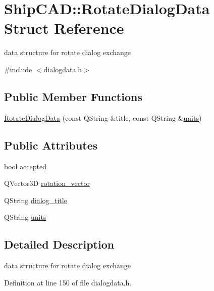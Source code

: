 \hypertarget{structShipCAD_1_1RotateDialogData}{}\section{Ship\+C\+AD\+:\+:Rotate\+Dialog\+Data Struct Reference}
\label{structShipCAD_1_1RotateDialogData}


data structure for rotate dialog exchange  




{\ttfamily \#include $<$dialogdata.\+h$>$}

\subsection*{Public Member Functions}
\begin{DoxyCompactItemize}
\item 
\hyperlink{structShipCAD_1_1RotateDialogData_a9314bfd6204d624e7141d76ee8e17e3a}{Rotate\+Dialog\+Data} (const Q\+String \&title, const Q\+String \&\hyperlink{structShipCAD_1_1RotateDialogData_a893de613d61c0c377dbbd1cee8cb6c19}{units})
\end{DoxyCompactItemize}
\subsection*{Public Attributes}
\begin{DoxyCompactItemize}
\item 
bool \hyperlink{structShipCAD_1_1RotateDialogData_a1e134e74a944807a063ac663526b0789}{accepted}
\item 
Q\+Vector3D \hyperlink{structShipCAD_1_1RotateDialogData_a53bd3533c7fd9e82d9298cbba080a430}{rotation\+\_\+vector}
\item 
Q\+String \hyperlink{structShipCAD_1_1RotateDialogData_af8648790d9c834ad4c65e3a188290738}{dialog\+\_\+title}
\item 
Q\+String \hyperlink{structShipCAD_1_1RotateDialogData_a893de613d61c0c377dbbd1cee8cb6c19}{units}
\end{DoxyCompactItemize}


\subsection{Detailed Description}
data structure for rotate dialog exchange 

Definition at line 150 of file dialogdata.\+h.



